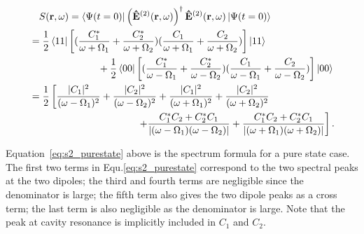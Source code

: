\begin{align}
&\quad S({\bf r},\omega) = \mathinner{\langle{\Psi(t=0)}|}\left(\mathbf{\hat{E}}^{(2)}({\bf
r},\omega)\right)^\dagger \mathbf{\hat{E}}^{(2)}({\bf
r},\omega)\mathinner{|{\Psi(t=0)}\rangle}  \nonumber\\
&= \frac{1}{2}\mathinner{\langle{11}|}\left[ (\frac{C_1^*}{\omega+\Omega_1}+ \frac{C_2^*}{\omega+\Omega_2}) (\frac{C_1}{\omega+\Omega_1} + \frac{C_2}{\omega+\Omega_2}) \right]\mathinner{|{11}\rangle} \nonumber \\
&\quad \quad \quad \quad \quad \quad \quad
+\frac{1}{2}\mathinner{\langle{00}|} \left[ (\frac{C_1^*}{\omega-\Omega_1}+ \frac{C_2^*}{\omega-\Omega_2})(\frac{C_1}{\omega-\Omega_1} + \frac{C_2}{\omega-\Omega_2}) \right]\mathinner{|{00}\rangle} \nonumber \\
&= \frac{1}{2}\left[\frac{|C_1|^2}{(\omega-\Omega_1)^2}+ \frac{|C_2|^2}{(\omega-\Omega_2)^2}+ \frac{|C_1|^2}{(\omega+\Omega_1)^2} +
\frac{|C_2|^2}{(\omega+\Omega_2)^2} \right.\nonumber \\
&\quad \quad \quad \quad \quad \quad \quad \quad \quad \quad \quad  \left.
+ \frac{C_1^*C_2+C_2^*C_1}{|(\omega-\Omega_1)(\omega-\Omega_2)|}
+ \frac{C_1^*C_2+C_2^*C_1}{|(\omega+\Omega_1)(\omega+\Omega_2)|}\right] . \label{eq:s2_purestate}
\end{align}

Equation~\ref{eq:s2_purestate} above is the spectrum formula for a pure state case. The first two terms in Equ.\eqref{eq:s2_purestate} correspond to the two spectral peaks at the two dipoles; the third and fourth terms are negligible since the denominator is large; the fifth term also gives the two dipole peaks as a cross term; the last term is also negligible as the denominator is large. Note that the peak at cavity resonance is implicitly included in $C_1$ and $C_2$.


